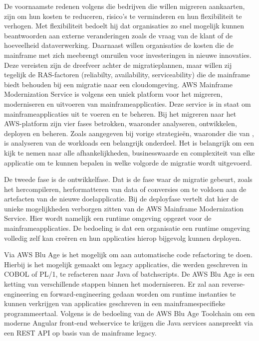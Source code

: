 De voornaamste redenen volgens \textcite{Valence2021} die bedrijven die willen migreren aankaarten, zijn om hun kosten te reduceren, risico's te verminderen en hun flexibiliteit te verhogen. Met flexibiliteit bedoelt hij dat organisaties zo snel mogelijk kunnen beantwoorden aan externe veranderingen zoals de vraag van de klant of de hoeveelheid dataverwerking. Daarnaast willen organisaties de kosten die de mainframe met zich meebrengt omruilen voor investeringen in nieuwe innovaties. Deze vereisten zijn de dreefveer achter de migratieplannen, maar willen zij tegelijk de RAS-factoren (reliabilty, availability, serviceability) die de mainframe biedt behouden bij een migratie naar een cloudomgeving. AWS Mainframe Modernization Service is volgens \textcite{Valence2021} een uniek platform voor het migreren, moderniseren en uitvoeren van mainframeapplicaties. Deze service is in staat om mainframeapplicaties uit te voeren en te beheren. Bij het migreren naar het AWS-platform zijn vier fases betrokken, waaronder analyseren, ontwikkelen, deployen en beheren. Zoals aangegeven bij vorige strategieën, waaronder die van \textcite{Marble2017}, is analyseren van de workloads een belangrijk onderdeel. Het is belangrijk om een kijk te nemen naar alle afhankelijkheden, businesswaarde en complexiteit van elke applicatie om te kunnen bepalen in welke volgorde de migratie wordt uitgevoerd. 

De tweede fase is de ontwikkelfase. Dat is de fase waar de migratie gebeurt, zoals het hercompileren, herformatteren van data of conversies om te voldoen aan de artefacten van de nieuwe doelapplicatie. Bij de deployfase vertelt \textcite{Valence2021} dat hier de unieke mogelijkheden verborgen zitten van de AWS Mainframe Modernization Service. Hier wordt namelijk een runtime omgeving opgezet voor de mainframeapplicaties. De bedoeling is dat een organisatie een runtime omgeving volledig zelf kan creëren en hun applicaties hierop bijgevolg kunnen deployen. 

Via AWS Blu Age is het mogelijk om aan automatische code refactoring te doen. Hierbij is het mogelijk gemaakt om legacy applicaties, die werden geschreven in COBOL of PL/1, te refacteren naar Java of batchscripts. De AWS Blu Age is een ketting van verschillende stappen binnen het moderniseren. Er zal aan reverse-engineering en forward-engineering gedaan worden om runtime instanties te kunnen verkrijgen van applicaties geschreven in een mainframespecifieke programmeertaal. Volgens \textcite{Valence2021} is de bedoeling van de AWS Blu Age Toolchain om een moderne Angular front-end webservice te krijgen die Java services aanspreekt via een REST API op basis van de mainframe legacy.  

